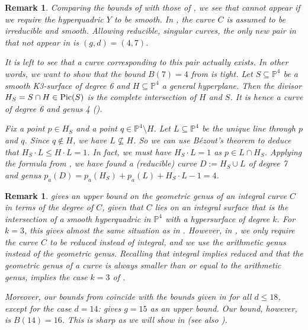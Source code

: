 \documentclass[english,11pt,reqno]{amsart}
\newcommand{\sub}{\subseteq}
\newcommand{\Pfour}{\mathbb{P}^4}
\newcommand{\Pic}{\textup{Pic}}
\newtheorem{rmk}[thm]{Remark}
\begin{document}
%
\begin{rmk}
Comparing the bounds of  with those of , we see that  cannot appear if we require the hyperquadric $Y$ to be smooth. In , the curve $C$ is assumed to be irreducible and smooth. Allowing reducible, singular curves, the only new pair in  that not appear in  is $(g,d)=(4,7)$. \par 
It is left to see that a curve corresponding to this pair actually exists. In other words, we want to show that the bound $B(7)=4$ from  is tight. Let $S\sub \Pfour$ be a smooth K3-surface of degree 6 and $H\sub \Pfour$ a general hyperplane. Then the divisor $H_S=S\cap H\in \Pic(S)$ is the complete intersection of $H$ and $S$. It is hence a curve of degree 6 and genus 4 (). \par 
Fix a point $p\in H_S$ and a point $q\in \Pfour \setminus H$. Let $L\sub \Pfour$ be the unique line through $p$ and $q$. Since $q\not \in H$, we have $L\not \sub H$. So we can use Bézout's theorem to deduce that $H_S\cdot L \leq  H \cdot L =1$. In fact, we must have $H_S\cdot L=1$ as $p\in L\cap H_S$. Applying the formula from , we have found a (reducible) curve $D:=H_S \cup L$ of degree 7 and genus $p_a(D)=p_a(H_S)+p_a(L)+H_S\cdot L -1= 4$.
\end{rmk}
%
\begin{rmk}
\cite{De_Cataldo-Genus_of_curves_on_3d_quadric} gives an upper bound on the geometric genus of an integral curve $C$ in terms of the degree of $C$, given that $C$ lies on an integral surface that is the intersection of a smooth hyperquadric in $\Pfour$ with a hypersurface of degree $k$. For $k=3$, this gives almost the same situation as in . However, in , we only require the curve $C$ to be reduced instead of integral, and we use the arithmetic genus instead of the geometric genus. Recalling that integral implies reduced and that the geometric genus of a curve is always smaller than or equal to the arithmetic genus,  implies the case $k=3$ of \cite[Thm.\ 1.4]{De_Cataldo-Genus_of_curves_on_3d_quadric}. \par 
Moreover, our bounds from  coincide with the bounds given in  \cite[Thm.\ 1.4]{De_Cataldo-Genus_of_curves_on_3d_quadric} for all $d\leq 18$, except for the case $d=14$: \cite[Thm.\ 1.4]{De_Cataldo-Genus_of_curves_on_3d_quadric} gives $g=15$ as an upper bound. Our bound, however, is $B(14)=16$. This is sharp as we will show in  (see also ). 
\end{rmk}
%
%
\end{document}
